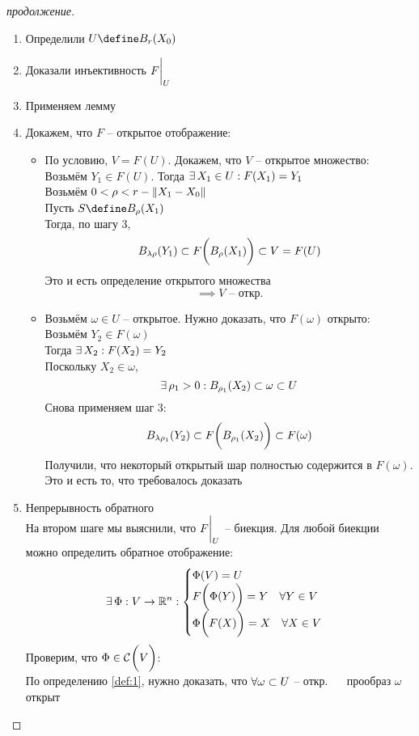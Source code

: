 \begin{proof}[продолжение]
	\hfill
	\begin{enumerate}
		\item Определили $ U \define B_r(X_0) $
		\item Доказали инъективность $ F\bigg|_{U}^{} $
		\item Применяем лемму
		\item Докажем, что $ F $ -- открытое отображение:
		\begin{itemize}
			\item По условию, $ V = F(U) $. Докажем, что $ V $ -- открытое множество: \\
			Возьмём $ Y_1 \in F(U) $. Тогда $ \exists\, X_1 \in U : F(X_1) = Y_1 $ \\
			Возьмём $ 0 < \rho < r - \left\|{X_1 - X_0}\right\| $ \\
			Пусть $ S \define B_{\rho}(X_1) $ \\
			Тогда, по шагу 3,
			$$ B_{\lambda\rho}(Y_1) \subset F \bigg( B_\rho(X_1) \bigg) \subset V = F(U) $$
			Это и есть определение открытого множества
			$$ \implies V \text{ -- откр.} $$
			\item Возьмём $ \omega \in U $ -- открытое. Нужно доказать, что $ F(\omega) $ открыто: \\
			Возьмём $ Y_2 \in F(\omega) $ \\
			Тогда $ \exists\, X_2 : F(X_2) = Y_2 $ \\
			Поскольку $ X_2 \in \omega $,
			$$ \exists\, \rho_1 > 0 : B_{\rho_1}(X_2) \subset \omega \subset U $$
			Снова применяем шаг 3:
			$$ B_{\lambda\rho_1}(Y_2) \subset F \bigg( B_{\rho_1}(X_2) \bigg) \subset F(\omega) $$
			Получили, что некоторый открытый шар полностью содержится в $ F(\omega) $. Это и есть то, что требовалось доказать
		\end{itemize}
		\item Непрерывность обратного \\
		На втором шаге мы выяснили, что $ F\bigg|_{U}^{} $ -- биекция. Для любой биекции можно определить обратное отображение:
		$$ \exists\, \Phi : V \to \mathbb{R}^n :
		\begin{cases}
			\Phi(V) = U \\
			F \bigg( \Phi(Y) \bigg) = Y \quad \forall Y \in V \\
			\Phi \bigg( F(X) \bigg) = X \quad \forall X \in V
		\end{cases} $$
		Проверим, что $ \Phi \in \mathcal{C}^{} \bigg( {V} \bigg)  $: \\
		По определению \ref{def:1}, нужно доказать, что $ \forall \omega \subset U $ -- откр. $ \quad $ прообраз $ \omega $ открыт \\

\end{enumerate}
\end{proof}
